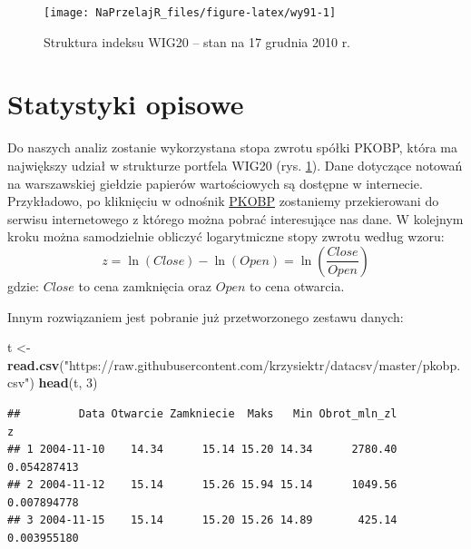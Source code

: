 \documentclass[polish,]{book}
\newenvironment{Shaded}{\begin{snugshade}}{\end{snugshade}}
\newcommand{\DecValTok}[1]{\textcolor[rgb]{0.00,0.00,0.81}{#1}}
\newcommand{\KeywordTok}[1]{\textcolor[rgb]{0.13,0.29,0.53}{\textbf{#1}}}
\newcommand{\NormalTok}[1]{#1}
\newcommand{\StringTok}[1]{\textcolor[rgb]{0.31,0.60,0.02}{#1}}
\begin{document}
\begin{figure}[h]

{\centering \texttt{[image: NaPrzelajR\_files/figure-latex/wy91-1]} 

}

\caption{Struktura indeksu WIG20 -- stan na 17 grudnia 2010 r.}\label{fig:wy91}
\end{figure}

\hypertarget{part_9.2}{%
\section{Statystyki opisowe}\label{part_9.2}}

Do naszych analiz zostanie wykorzystana stopa zwrotu spółki PKOBP, która ma
największy udział w strukturze portfela WIG20 (rys. \ref{fig:wy91}). Dane dotyczące notowań na warszawskiej giełdzie papierów wartościowych są dostępne w internecie. Przykładowo, po kliknięciu w odnośnik \href{https://www.money.pl/gielda/spolki-gpw/PLPKO0000016.html}{PKOBP}
zostaniemy przekierowani do serwisu internetowego z którego można pobrać interesujące nas dane. W kolejnym kroku można samodzielnie obliczyć logarytmiczne stopy zwrotu według wzoru:
\begin{equation}
z=\ln(Close)-\ln(Open)=\ln\left(\frac{Close}{Open}\right)
\label{eq:wz91}
\end{equation}
gdzie: \(Close\) to cena zamknięcia oraz \(Open\) to cena otwarcia.

Innym rozwiązaniem jest pobranie już przetworzonego zestawu danych:

\begin{Shaded}
\begin{Highlighting}[]
\NormalTok{t <-}\StringTok{ }\KeywordTok{read.csv}\NormalTok{(}\StringTok{"https://raw.githubusercontent.com/krzysiektr/datacsv/master/pkobp.csv"}\NormalTok{)}
\KeywordTok{head}\NormalTok{(t, }\DecValTok{3}\NormalTok{)}
\end{Highlighting}
\end{Shaded}

\begin{verbatim}
##         Data Otwarcie Zamkniecie  Maks   Min Obrot_mln_zl           z
## 1 2004-11-10    14.34      15.14 15.20 14.34      2780.40 0.054287413
## 2 2004-11-12    15.14      15.26 15.94 15.14      1049.56 0.007894778
## 3 2004-11-15    15.14      15.20 15.26 14.89       425.14 0.003955180
\end{verbatim}
\end{document}
